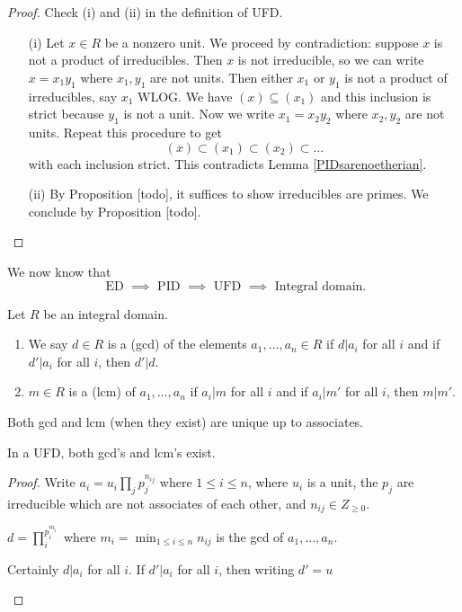 \documentclass[egregdoesnotlikesansseriftitles,a4paper]{scrartcl}
\begin{document}
\begin{proof}
       Check (i) and (ii) in the definition of UFD.
       \begin{itemize}
             \item[(i)] Let $ x \in R$ be a nonzero unit. We proceed by contradiction: suppose $x$ is not a product of irreducibles. Then $x $ is not irreducible, so we can write $x= x_1 y_1 $ where $x_1 ,y_1 $ are not units. Then either $x_1 $ or $y_1$ is not a product of irreducibles, say $x_1 $ WLOG. We have $(x)\subseteq (x_1 )$ and this inclusion is strict because $y_1 $ is not a unit.
             Now we write $x_1 =x_2 y_2 $ where $x_2 , y_2 $ are not units. Repeat this procedure to get \[
             (x)\subset (x_1 )\subset (x_2 ) \subset \ldots 
             \] with each inclusion strict. This contradicts Lemma \ref{PIDsarenoetherian}.
             \item[(ii)] By Proposition [todo], it suffices to show irreducibles are primes. We conclude by Proposition [todo].
       \end{itemize}
\end{proof}
\begin{remark}
       We now know that \[
       \text{ ED } \implies \text{ PID } \implies \text{ UFD } \implies \text{ Integral domain} 
       .\] 
\end{remark}
\begin{definition*}
       Let $R$ be an integral domain.
       \begin{enumerate}
             \item We say $d \in R$ is a  (gcd) of the elements $a_1 , \ldots, a_n \in R$ if $d|a_{i}$ for all $i$ and if $d' | a_i$ for all $i$, then $d' |d$.
             \item $m \in R$ is a  (lcm) of $a_1 ,\ldots ,a_n$ if $a_{i}|m$ for all $i$ and if $a_i| m'$ for all $i$, then $m|m'$.
       \end{enumerate}
       Both gcd and lcm (when they exist) are unique up to associates.
\end{definition*}
\begin{proposition}
       In a UFD, both gcd's and lcm's exist.
\end{proposition}
\begin{proof}
       Write $a_i = u_i \prod_{j}p_{j}^{n_{ij}}$ where $1 \leq i \leq n$, where $u_{i}$ is a unit, the $p_{j}$ are irreducible which are not associates of each other, and $n_{ij}\in Z_{\geq 0}$. 
       \begin{claim}
             $d=\prod_{i}^{p_{i}^{m_i}}$ where $m_i=\min_{1 \leq i \leq n} n_{ij}$ is the gcd of $a_1 , \ldots, a_n$.
       \end{claim}
       \begin{prooff}
             Certainly $d| a_{i}$ for all $i$. If $d'|a_{i}$ for all $i$, then writing $d'=u $ 
       \end{prooff}
       
\end{proof}
\end{document}
